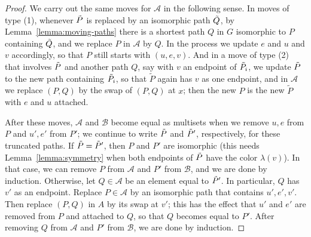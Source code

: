 \documentclass[a4paper, 11pt]{amsart}
\numberwithin{theorem}{section}
\newcommand{\cA}{\mathcal{A}}
\newcommand{\cB}{\mathcal{B}}
\begin{document}
\begin{proof}
We carry out the same moves for $\cA$ in the following sense. In moves
of type (1), whenever $\Tilde{P}$ is replaced by an isomorphic path
$\Tilde{Q}$, by Lemma~\ref{lemma:moving-paths} there is a shortest path
$Q$ in $G$ isomorphic to $P$ containing $\Tilde{Q}$, and we replace $P$
in $\cA$ by $Q$. In the process we update $e$ and $u$ and $v$
accordingly, so that $P$ still starts with $(u,e,v)$. And in a move of type (2)
that involves $\Tilde{P}$ and another path $Q$, say with $v$ an endpoint of $\Tilde{P}_i$, we update $\Tilde{P}$ to the new path containing $\Tilde{P}_i$,
so that $\tilde{P}$ again has $v$ as one endpoint, and in $\cA$ we 
replace $(P,Q)$ by the swap of $(P,Q)$ at $x$; then the new $P$ is the
new $\tilde{P}$ with $e$ and $u$ attached. 

After these moves, $\cA$ and $\cB$ become equal as multisets when
we remove $u,e$ from $P$ and $u',e'$ from $P'$; we continue to write
$\Tilde{P}$ and $\Tilde{P}'$, respectively, for these truncated paths.
If $\Tilde{P}=\Tilde{P}'$, then $P$ and $P'$ are isomorphic (this needs
Lemma~\ref{lemma:symmetry} when both endpoints of $\Tilde{P}$ have the
color $\lambda(v)$). In that case, we can remove $P$ from $\cA$ and $P'$
from $\cB$, and we are done by induction.  Otherwise, let $Q \in \cA$
be an element equal to $\Tilde{P}'$. In particular, $Q$ has $v'$ as an
endpoint.  Replace $P \in \cA$ by an isomorphic path that contains
$u',e',v'$. Then replace $(P,Q)$ in $A$ by its swap at $v'$; this has
the effect that $u'$ and $e'$ are removed from $P$ and attached to $Q$,
so that $Q$ becomes equal to $P'$. After removing $Q$ from $\cA$ and $P'$
from $\cB$, we are done by induction.
\end{proof}
\end{document}
